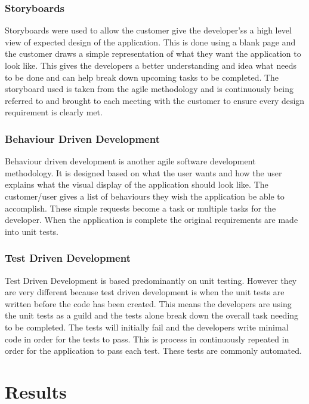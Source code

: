 \subsection{Storyboards}

Storyboards were used to allow the customer give the developer’ss a high level view of expected design of the application. This is done using a blank page and the customer draws a simple representation of what they want the application to look like. This gives the developers a better understanding and idea what needs to be done and can help break down upcoming tasks to be completed. The storyboard used is taken from the agile methodology and is continuously being referred to and brought to each meeting with the customer to ensure every design requirement is clearly met. \cite{StoryBoard}

\subsection{Behaviour Driven Development}

Behaviour driven development is another agile software development methodology. It is designed based on what the user wants and how the user explains what the visual display of the application should look like. The customer/user gives a list of behaviours they wish the application be able to accomplish. These simple requests become a task or multiple tasks for the developer. When the application is complete the original requirements are made into unit tests.\cite{BDD} 

\subsection{Test Driven Development}

Test Driven Development is based predominantly on unit testing. However they are very different because test driven development is when the unit tests are written before the code has been created. This means the developers are using the unit tests as a guild and the tests alone break down the overall task needing to be completed. The tests will initially fail and the developers write minimal code in order for the tests to pass. This is process in continuously repeated in order for the application to pass each test. These tests are commonly automated.\cite{TDD}

\chapter{Results}
